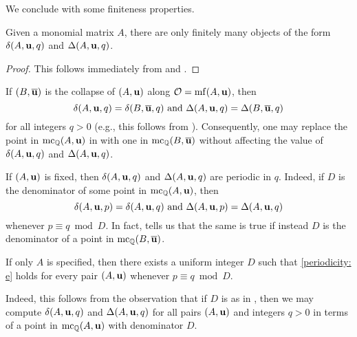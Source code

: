 \documentclass[11pt]{amsart}
\renewcommand{\!}[1]{{\color{red}\text{$\star$\,}#1\,$\star$}}
\newcommand{\ol}[1]{\overline{#1}}
\begin{document}
We conclude with some finiteness properties.

\begin{proposition}
\label{finitely many deltas for a fixed A: P}
 Given a monomial matrix $A$, there are only finitely many objects of the form $\delta(A, \mathbf{u}, q)$ and $\Delta(A, \mathbf{u}, q)$.
\end{proposition}

\begin{proof}
This follows immediately from  and .
\end{proof}

\begin{remark}  
\label{comparing deltas: R}
If $(B, \ol{\vv{u}})$ is the collapse of $(A, \mathbf{u})$ along $\mathcal{O} = \operatorname{mf}(A, \mathbf{u})$, then  
\[ \delta(A, \vv{u}, q) = \delta(B, \ol{\vv{u}}, q)  \text{ and }  \Delta(A, \vv{u},q) = \Delta(B, \ol{\vv{u}}, q)\] for all integers $q>0$ (e.g., this follows from ).   Consequently, one may replace the point in $\operatorname{mc}_{\mathbb{Q}}(A, \mathbf{u})$ in    with one in $\mc_{\QQ}(B, \ol{\vv{u}})$ without affecting the value of $\delta(A, \mathbf{u}, q)$ and $\Delta(A, \mathbf{u}, q)$.
\end{remark}

\begin{remark}
\label{pair periodicity: R}
If $(A, \mathbf{u})$ is fixed, then $\delta(A, \mathbf{u}, q)$ and $\Delta(A, \mathbf{u}, q)$ are periodic in $q$.  Indeed, if $D$ is the denominator of some point in $\operatorname{mc}_{\mathbb{Q}}(A, \mathbf{u})$, then 
\begin{equation}
\label{periodicity: e}
 \delta(A, \mathbf{u}, p) = \delta(A, \mathbf{u}, q)  \text{ and } \Delta(A, \mathbf{u}, p) = \Delta(A, \mathbf{u}, q)
\end{equation} whenever $p \equiv q \bmod D$.    In fact,  tells us that the same is true if instead $D$ is the denominator of a point in $\mc_{\QQ}(B, \ol{\vv{u}})$.
\end{remark}

\begin{remark}
\label{uniform periodicity: R}
 If only $A$ is specified, then there exists a uniform integer $D$ such that \eqref{periodicity: e} holds for every pair $(A, \mathbf{u})$ whenever $p \equiv q \bmod D$.  
 
 Indeed,  this follows from the observation that if $D$ is as in , then we may compute  $\delta(A, \mathbf{u}, q)$ and $\Delta(A, \mathbf{u}, q)$ for all pairs $(A, \mathbf{u})$ and integers $q>0$ in terms of a point in $\operatorname{mc}_{\mathbb{Q}}(A, \mathbf{u})$ with denominator $D$.
\end{remark}
\end{document}
